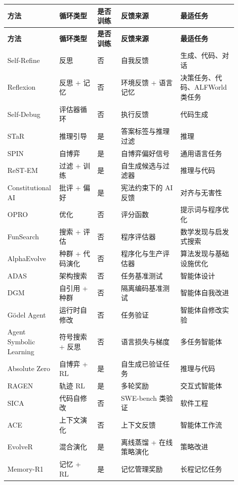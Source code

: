 {\TableTight
\begin{longtable}{@{}L{0.17\linewidth}L{0.16\linewidth}L{0.10\linewidth}L{0.25\linewidth}L{0.24\linewidth}@{}}
\toprule
\textbf{方法} & \textbf{循环类型} & \textbf{是否训练} & \textbf{反馈来源} & \textbf{最适任务} \\
\midrule
\endfirsthead
\toprule
\textbf{方法} & \textbf{循环类型} & \textbf{是否训练} & \textbf{反馈来源} & \textbf{最适任务} \\
\midrule
\endhead
\bottomrule
\endlastfoot
Self-Refine & 反思 & 否 & 自我反馈 & 生成、代码、对话 \\
Reflexion & 反思 + 记忆 & 否 & 环境反馈 + 语言记忆 & 决策任务、代码、ALFWorld 类任务 \\
Self-Debug & 评估器循环 & 否 & 执行反馈 & 代码生成 \\
STaR & 推理引导 & 是 & 答案标签与推理过滤 & 推理 \\
SPIN & 自博弈 & 是 & 自博弈偏好信号 & 通用语言任务 \\
ReST-EM & 过滤 + 训练 & 是 & 自生成候选与过滤器 & 推理与代码 \\
Constitutional AI & 批评 + 偏好 & 是 & 宪法约束下的 AI 反馈 & 对齐与无害性 \\
OPRO & 优化 & 否 & 评分函数 & 提示词与程序优化 \\
FunSearch & 搜索 + 评估 & 否 & 程序评估器 & 数学发现与启发式搜索 \\
AlphaEvolve & 种群 + 代码演化 & 否 & 程序化与生产评估器 & 算法发现与基础设施优化 \\
ADAS & 架构搜索 & 否 & 任务基准测试 & 智能体设计 \\
DGM & 自引用 + 种群 & 否 & 隔离编码基准测试 & 智能体自我改进 \\
G\"{o}del Agent & 运行时自修改 & 否 & 任务验证 & 智能体自修改实验 \\
Agent Symbolic Learning & 符号搜索 + 反思 & 否 & 语言损失与梯度 & 多任务智能体 \\
Absolute Zero & 自博弈 + RL & 是 & 自生成已验证任务 & 推理与代码 \\
RAGEN & 轨迹 RL & 是 & 多轮奖励 & 交互式智能体 \\
SICA & 代码自修改 & 否 & SWE-bench 类验证 & 软件工程 \\
ACE & 上下文演化 & 否 & 上下文反馈 & 智能体工作流 \\
EvolveR & 混合演化 & 是 & 离线蒸馏 + 在线策略演化 & 策略改进 \\
Memory-R1 & 记忆 + RL & 是 & 记忆管理奖励 & 长程记忆任务 \\
\end{longtable}}

